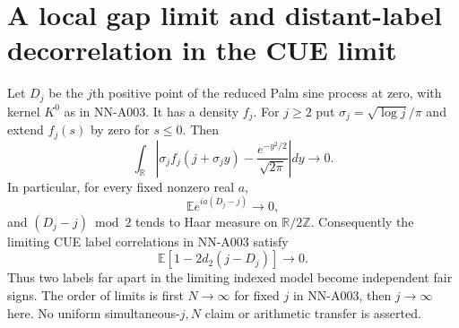 \section{A local gap limit and distant-label decorrelation in the CUE limit}

\begin{theorem}
Let $D_j$ be the $j$th positive point of the reduced Palm sine process
at zero, with kernel $K^0$ as in NN-A003. It has a density $f_j$.
For $j\ge2$ put $\sigma_j=\sqrt{\log j}/\pi$ and extend $f_j(s)$
by zero for $s\le0$. Then
\[
 \int_{\mathbb R}\left|
 \sigma_j f_j(j+\sigma_j y)
       -\frac{e^{-y^2/2}}{\sqrt{2\pi}}\right|dy\longrightarrow0.
                                                        \tag{A016.1}
\]
In particular, for every fixed nonzero real $a$,
\[
 \mathbb E e^{ia(D_j-j)}\longrightarrow0,               \tag{A016.2}
\]
and $(D_j-j)\bmod2$ tends to Haar measure on $\mathbb R/2\mathbb Z$.
Consequently the limiting CUE label correlations in NN-A003 satisfy
\[
 \mathbb E[1-2d_2(j-D_j)]\longrightarrow0.
\]
Thus two labels far apart in the limiting indexed model become
independent fair signs. The order of limits is first $N\to\infty$
for fixed $j$ in NN-A003, then $j\to\infty$ here. No uniform
simultaneous-$j,N$ claim or arithmetic transfer is asserted.
\end{theorem}

